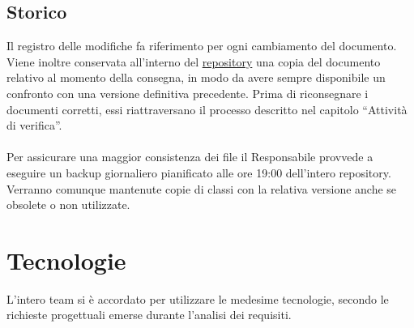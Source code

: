 \documentclass[a4paper,11pt]{article}
\begin{document}
\subsection{Storico}
Il registro delle modifiche fa riferimento per ogni cambiamento del documento. Viene inoltre conservata all'interno del \underline{repository} una copia del documento relativo al momento della consegna, in modo da avere sempre disponibile un confronto con una versione definitiva precedente. Prima di riconsegnare i documenti corretti, essi riattraversano il processo descritto nel capitolo ``Attivit\`a di verifica''.\\
\\
Per assicurare una maggior consistenza dei file il Responsabile provvede a eseguire un backup giornaliero pianificato alle ore 19:00 dell'intero repository. Verranno comunque mantenute copie di classi con la relativa versione anche se obsolete o non utilizzate.

\newpage
\section{Tecnologie}
L'intero team si \`e accordato per utilizzare le medesime tecnologie, secondo le richieste progettuali emerse durante l'analisi dei requisiti.
\end{document}
